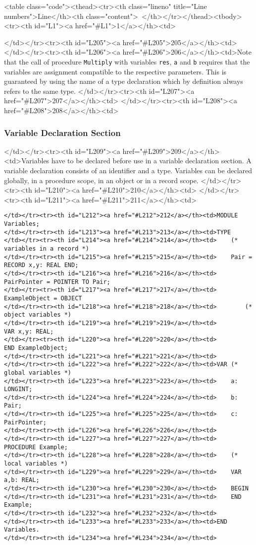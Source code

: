 <table class="code"><thead><tr><th class="lineno" title="Line numbers">Line</th><th class="content"> </th></tr></thead><tbody><tr><th id="L1"><a href="#L1">1</a></th><td>\documentclass[a4paper,11pt]{article}
\begin{document}
</td></tr><tr><th id="L205"><a href="#L205">205</a></th><td>
</td></tr><tr><th id="L206"><a href="#L206">206</a></th><td>Note that the call of procedure \verb+Multiply+ with variables \verb+res+, \verb+a+ and \verb+b+ requires that the variables are assignment compatible to the respective parameters. This is guaranteed by using the name of a type declaration which by definition always refers to the same type.
</td></tr><tr><th id="L207"><a href="#L207">207</a></th><td>
</td></tr><tr><th id="L208"><a href="#L208">208</a></th><td>\subsubsection{Variable Declaration Section}\label{section:VariableDeclarationSection}
</td></tr><tr><th id="L209"><a href="#L209">209</a></th><td>Variables have to be declared before use in a variable declaration section. A variable declaration consists of an identifier and a type. Variables can be declared globally, in a procedure scope, in an object or in a record scope.
</td></tr><tr><th id="L210"><a href="#L210">210</a></th><td>
</td></tr><tr><th id="L211"><a href="#L211">211</a></th><td>\begin{lstlisting}[language=Oberon,frame=none,caption={Variables and Parameters}]
</td></tr><tr><th id="L212"><a href="#L212">212</a></th><td>MODULE Variables;
</td></tr><tr><th id="L213"><a href="#L213">213</a></th><td>TYPE
</td></tr><tr><th id="L214"><a href="#L214">214</a></th><td>    (* variables in a record *)
</td></tr><tr><th id="L215"><a href="#L215">215</a></th><td>    Pair = RECORD x,y: REAL END;
</td></tr><tr><th id="L216"><a href="#L216">216</a></th><td>    PairPointer = POINTER TO Pair;
</td></tr><tr><th id="L217"><a href="#L217">217</a></th><td>    ExampleObject = OBJECT
</td></tr><tr><th id="L218"><a href="#L218">218</a></th><td>        (* object variables *)
</td></tr><tr><th id="L219"><a href="#L219">219</a></th><td>        VAR x,y: REAL;
</td></tr><tr><th id="L220"><a href="#L220">220</a></th><td>        END ExampleObject;
</td></tr><tr><th id="L221"><a href="#L221">221</a></th><td>
</td></tr><tr><th id="L222"><a href="#L222">222</a></th><td>VAR (* global variables *)
</td></tr><tr><th id="L223"><a href="#L223">223</a></th><td>    a: LONGINT;
</td></tr><tr><th id="L224"><a href="#L224">224</a></th><td>    b: Pair;
</td></tr><tr><th id="L225"><a href="#L225">225</a></th><td>    c: PairPointer;
</td></tr><tr><th id="L226"><a href="#L226">226</a></th><td>
</td></tr><tr><th id="L227"><a href="#L227">227</a></th><td>    PROCEDURE Example;
</td></tr><tr><th id="L228"><a href="#L228">228</a></th><td>    (* local variables *)
</td></tr><tr><th id="L229"><a href="#L229">229</a></th><td>    VAR a,b: REAL;
</td></tr><tr><th id="L230"><a href="#L230">230</a></th><td>    BEGIN
</td></tr><tr><th id="L231"><a href="#L231">231</a></th><td>    END Example;
</td></tr><tr><th id="L232"><a href="#L232">232</a></th><td>
</td></tr><tr><th id="L233"><a href="#L233">233</a></th><td>END Variables.
</td></tr><tr><th id="L234"><a href="#L234">234</a></th><td>\end{lstlisting}
\end{document}
